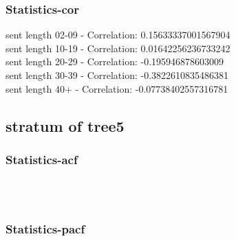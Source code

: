 \documentclass{article}%
\begin{document}
%
\newpage%
\subsubsection{Statistics{-}cor}%
\label{ssubsec:Statistics{-}cor}%
\noindent%
sent length 02-09 - Correlation: 0.15633337001567904\\%
sent length 10-19 - Correlation: 0.01642256236733242\\%
sent length 20-29 - Correlation: -0.195946878603009\\%
sent length 30-39 - Correlation: -0.3822610835486381\\%
sent length 40+ - Correlation: -0.07738402557316781\\

%
\newpage

%
\subsection{stratum of tree5}%
\label{subsec:stratumoftree5}%
\subsubsection{Statistics{-}acf}%
\label{ssubsec:Statistics{-}acf}%


\begin{figure}[ht]%
\centering%
\setlength{\abovecaptionskip}{-35pt}%
%
%
\\%
%
%
\\%
%
\end{figure}

%
\newpage%
\subsubsection{Statistics{-}pacf}%
\label{ssubsec:Statistics{-}pacf}%
\end{document}
